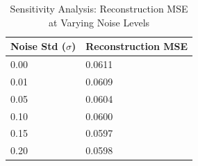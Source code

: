 \begin{table}[H]
\caption{Sensitivity Analysis: Reconstruction MSE at Varying Noise Levels}
\begin{center}
\begin{tabular}{l l}
\toprule
\textbf{Noise Std ($\sigma$)} & \textbf{Reconstruction MSE} \\
\midrule
0.00 & 0.0611 \\
0.01 & 0.0609 \\
0.05 & 0.0604 \\
0.10 & 0.0600 \\
0.15 & 0.0597 \\
0.20 & 0.0598 \\
\bottomrule
\end{tabular}
\end{center}
\end{table}

